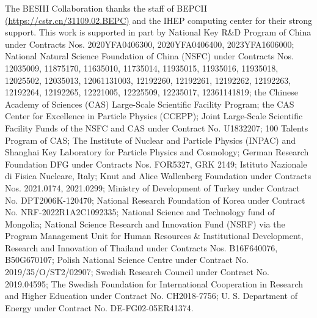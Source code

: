 \documentclass[amsmath,amssymb,twocolumn,prd,floatfix,showpacs,nofootinbib]{revtex4-1}
\begin{document}
The BESIII Collaboration thanks the staff of BEPCII {\hypersetup{urlcolor=black}\href{https://cstr.cn/31109.02.BEPC}{(https://cstr.cn/31109.02.BEPC)}} and the IHEP computing center for their strong support. This work is supported in part by National Key R\&D Program of China under Contracts Nos. 2020YFA0406300, 2020YFA0406400, 2023YFA1606000; National Natural Science Foundation of China (NSFC) under Contracts Nos. 12035009, 11875170, 11635010, 11735014, 11935015, 11935016, 11935018, 12025502, 12035013, 12061131003, 12192260, 12192261, 12192262, 12192263, 12192264, 12192265, 12221005, 12225509, 12235017, 12361141819; the Chinese Academy of Sciences (CAS) Large-Scale Scientific Facility Program; the CAS Center for Excellence in Particle Physics (CCEPP); Joint Large-Scale Scientific Facility Funds of the NSFC and CAS under Contract No. U1832207; 100 Talents Program of CAS; The Institute of Nuclear and Particle Physics (INPAC) and Shanghai Key Laboratory for Particle Physics and Cosmology; German Research Foundation DFG under Contracts Nos. FOR5327, GRK 2149; Istituto Nazionale di Fisica Nucleare, Italy; Knut and Alice Wallenberg Foundation under Contracts Nos. 2021.0174, 2021.0299; Ministry of Development of Turkey under Contract No. DPT2006K-120470; National Research Foundation of Korea under Contract No. NRF-2022R1A2C1092335; National Science and Technology fund of Mongolia; National Science Research and Innovation Fund (NSRF) via the Program Management Unit for Human Resources \& Institutional Development, Research and Innovation of Thailand under Contracts Nos. B16F640076, B50G670107; Polish National Science Centre under Contract No. 2019/35/O/ST2/02907; Swedish Research Council under Contract No. 2019.04595; The Swedish Foundation for International Cooperation in Research and Higher Education under Contract No. CH2018-7756; U. S. Department of Energy under Contract No. DE-FG02-05ER41374.
\end{document}

